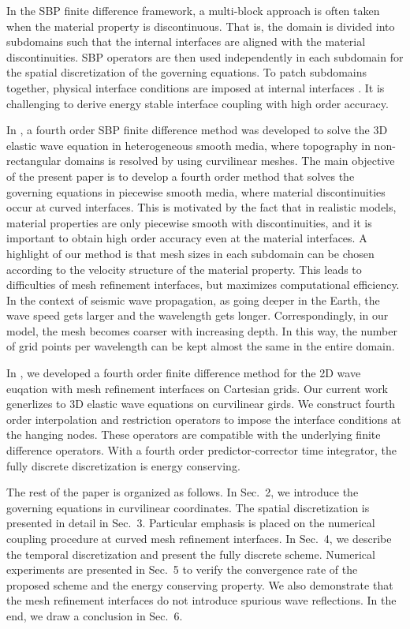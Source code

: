 In the SBP finite difference framework, a multi-block approach is often taken when the material property is discontinuous. That is, the domain is divided into subdomains such that the internal interfaces are aligned with the material discontinuities. SBP operators are then used independently in each subdomain for the spatial discretization of the governing equations. To patch subdomains together, physical interface conditions are imposed at internal interfaces \cite{Almquist2019,duru2014stable}. It is challenging to derive energy stable interface coupling with high order accuracy. 

In \cite{petersson2015wave}, a fourth order SBP finite difference method was developed to solve the 3D elastic wave equation in heterogeneous smooth media, where topography in non-rectangular domains is resolved by using curvilinear meshes. The main objective of the present paper is to develop a fourth order method that solves the governing equations in piecewise smooth media, where material discontinuities occur at curved interfaces.   This is motivated by the fact that in realistic models, material properties are only piecewise smooth with discontinuities, and it is important to obtain high order accuracy even at the material interfaces. A highlight of our method is that mesh sizes in each subdomain can be chosen according to the velocity structure of the material property. This leads to difficulties of mesh refinement interfaces, but maximizes computational efficiency. In the context of seismic wave propagation, as going deeper in the Earth, the wave speed gets larger and the wavelength gets longer. Correspondingly, in our model, the mesh becomes coarser with increasing depth. In this way, the number of grid points per wavelength can be kept almost the same in the entire domain. 

In \cite{wang2018fourth}, we developed a fourth order finite difference method for the 2D wave euqation with mesh refinement interfaces on Cartesian grids. Our current work generlizes to 3D elastic wave equations on curvilinear girds. We construct fourth order interpolation and restriction operators to impose the interface conditions at the hanging nodes. These operators are compatible with the underlying finite difference operators. With a fourth order predictor-corrector time integrator, the fully discrete discretization is energy conserving. 

The rest of the paper is organized as follows. In Sec.~2, we introduce the governing equations in curvilinear coordinates. The spatial discretization is presented in detail in Sec.~3. Particular emphasis is placed on the numerical coupling procedure at curved mesh refinement interfaces. In Sec.~4, we describe the temporal discretization and present the fully discrete scheme. Numerical experiments are presented in Sec.~5 to verify the convergence rate of the proposed scheme and the energy conserving property. We also demonstrate that the mesh refinement interfaces do not introduce spurious wave reflections. In the end, we draw a conclusion in Sec.~6. 
